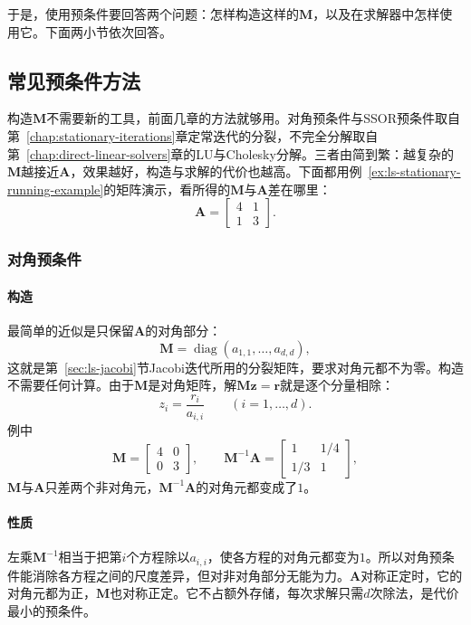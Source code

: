 于是，使用预条件要回答两个问题：怎样构造这样的$\bm M$，以及在求解器中怎样使用它。下面两小节依次回答。

\subsection{常见预条件方法}
\label{sec:ls-preconditioner-constructions}

构造$\bm M$不需要新的工具，前面几章的方法就够用。对角预条件与SSOR预条件取自第~\ref{chap:stationary-iterations}章定常迭代的分裂，不完全分解取自第~\ref{chap:direct-linear-solvers}章的LU与Cholesky分解。三者由简到繁：越复杂的$\bm M$越接近$\bm A$，效果越好，构造与求解的代价也越高。下面都用例~\ref{ex:ls-stationary-running-example}的矩阵演示，看所得的$\bm M$与$\bm A$差在哪里：
\[
 \bm A=\begin{bmatrix}4&1\\1&3\end{bmatrix}.
\]

\subsubsection{对角预条件}
\label{sec:ls-diagonal-preconditioning}

\paragraph{构造}
最简单的近似是只保留$\bm A$的对角部分：
\begin{equation}
 \bm M=\operatorname{diag}(a_{1,1},\ldots,a_{d,d}),
 \label{eq:ls-diagonal-preconditioner-matrix}
\end{equation}
这就是第~\ref{sec:ls-jacobi}节Jacobi迭代所用的分裂矩阵，要求对角元都不为零。构造不需要任何计算。由于$\bm M$是对角矩阵，解$\bm M\bm z=\bm r$就是逐个分量相除：
\begin{equation}
 z_i=\frac{r_i}{a_{i,i}}\qquad(i=1,\ldots,d).
 \label{eq:ls-diagonal-preconditioner}
\end{equation}
例中
\[
 \bm M=\begin{bmatrix}4&0\\0&3\end{bmatrix},\qquad
 \bm M^{-1}\bm A=\begin{bmatrix}1&1/4\\1/3&1\end{bmatrix},
\]
$\bm M$与$\bm A$只差两个非对角元，$\bm M^{-1}\bm A$的对角元都变成了$1$。

\paragraph{性质}
左乘$\bm M^{-1}$相当于把第$i$个方程除以$a_{i,i}$，使各方程的对角元都变为$1$。所以对角预条件能消除各方程之间的尺度差异，但对非对角部分无能为力。$\bm A$对称正定时，它的对角元都为正，$\bm M$也对称正定。它不占额外存储，每次求解只需$d$次除法，是代价最小的预条件。

